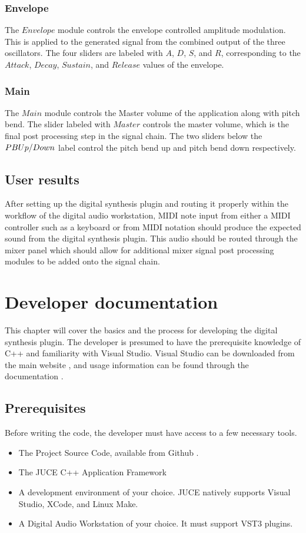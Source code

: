 \documentclass[a4paper,12pt]{report}
\begin{document}
\subsection{Envelope}
\label{subsec:env}
The $Envelope$ module controls the envelope controlled amplitude modulation. This is applied to the generated signal from the combined output of the three oscillators. The four sliders are labeled with $A$, $D$, $S$, and $R$, corresponding to the $Attack$, $Decay$, $Sustain$, and $Release$ values of the envelope.

\subsection{Main}
\label{subsec:main}
The $Main$ module controls the Master volume of the application along with pitch bend. The slider labeled with $Master$ controls the master volume, which is the final post processing step in the signal chain. The two sliders below the $PB \-Up/Down$ label control the pitch bend up and pitch bend down respectively.

\section{User results}
After setting up the digital synthesis plugin and routing it properly within the workflow of the digital audio workstation, MIDI note input from either a MIDI controller such as a keyboard or from MIDI notation should produce the expected sound from the digital synthesis plugin. This audio should be routed through the mixer panel which should allow for additional mixer signal post processing modules to be added onto the signal chain.

\chapter{Developer documentation}
\label{chapter:devdocs}
This chapter will cover the basics and the process for developing the digital synthesis plugin. The developer is presumed to have the prerequisite knowledge of C++ and familiarity with Visual Studio. Visual Studio can be downloaded from the main website \cite{visualstudio}, and usage information can be found through the documentation \cite{vsdocs}.

\section{Prerequisites}
\label{sec:prereq}
Before writing the code, the developer must have access to a few necessary tools.
\begin{itemize}
\item The Project Source Code, available from Github \cite{github}.
\item The JUCE C++ Application Framework \cite{madewithjuce}
\item A development environment of your choice. JUCE natively supports Visual Studio, XCode, and Linux Make.
\item A Digital Audio Workstation of your choice. It must support VST3 plugins.
\end{itemize}
\end{document}
